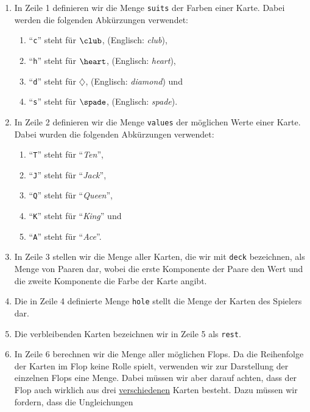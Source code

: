 \begin{enumerate}
\item In Zeile 1 definieren wir die Menge \texttt{suits} der Farben einer Karte.
      Dabei werden die folgenden Abk\"{u}rzungen verwendet:
      \begin{enumerate}
      \item ``\texttt{c}'' steht f\"{u}r $\club$, (Englisch: \emph{club}),
      \item ``\texttt{h}'' steht f\"{u}r $\heart$, (Englisch: \emph{heart}), 
      \item ``\texttt{d}'' steht f\"{u}r $\diamondsuit$, (Englisch: \emph{diamond}) und
      \item ``\texttt{s}'' steht f\"{u}r $\spade$, (Englisch: \emph{spade}). 
      \end{enumerate} 
\item In Zeile 2 definieren wir die Menge \texttt{values} der m\"{o}glichen Werte einer
      Karte.  Dabei wurden die folgenden Abk\"{u}rzungen verwendet:
      \begin{enumerate}
      \item ``\texttt{T}'' steht f\"{u}r ``\emph{Ten}'',
      \item ``\texttt{J}'' steht f\"{u}r ``\emph{Jack}'',
      \item ``\texttt{Q}'' steht f\"{u}r ``\emph{Queen}'',
      \item ``\texttt{K}'' steht f\"{u}r ``\emph{King}'' und
      \item ``\texttt{A}'' steht f\"{u}r ``\emph{Ace}''.
      \end{enumerate}
\item In Zeile 3 stellen wir die Menge aller Karten, die wir mit \texttt{deck} bezeichnen,
      als Menge von Paaren dar, wobei die erste Komponente der Paare den Wert und die zweite Komponente 
      die Farbe der Karte angibt.
\item Die in Zeile 4 definierte Menge \texttt{hole} stellt die Menge der Karten des Spielers dar.
\item Die verbleibenden Karten bezeichnen wir in Zeile 5 als \texttt{rest}.
\item In Zeile 6 berechnen wir die Menge aller m\"{o}glichen Flops.  Da die Reihenfolge der Karten im
      Flop keine Rolle spielt, verwenden wir zur Darstellung der einzelnen Flops eine Menge.
      Dabei m\"{u}ssen wir aber darauf achten, dass der Flop auch wirklich aus drei
      \underline{verschiedenen}  Karten besteht.  Dazu m\"{u}ssen wir fordern, dass die Ungleichungen

\end{enumerate}

